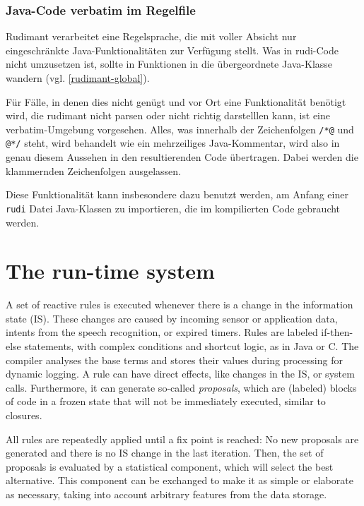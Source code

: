 \subsubsection{Java-Code verbatim im Regelfile} \label{rudi-verbatim}

Rudimant verarbeitet eine Regelsprache, die mit voller Absicht nur
eingeschränkte Java-Funktionalitäten zur Verfügung stellt. Was in rudi-Code
nicht umzusetzen ist, sollte in Funktionen in die übergeordnete Java-Klasse
wandern (vgl. \ref{rudimant-global}).

Für Fälle, in denen dies nicht genügt und vor Ort eine Funktionalität benötigt
wird, die rudimant nicht parsen oder nicht richtig darstelllen kann, ist eine
verbatim-Umgebung vorgesehen. Alles, was innerhalb der Zeichenfolgen \verb|/*@|
und \verb|@*/| steht, wird behandelt wie ein mehrzeiliges Java-Kommentar, wird
also in genau diesem Aussehen in den resultierenden Code übertragen. Dabei
werden die klammernden Zeichenfolgen ausgelassen.

Diese Funktionalität kann insbesondere dazu benutzt werden, am Anfang einer
\texttt{rudi} Datei Java-Klassen zu importieren, die im kompilierten Code
gebraucht werden.

\section{The run-time system}

A set of reactive rules is executed whenever there is a change in the
information state (IS). These changes are caused by incoming sensor or
application data, intents from the speech recognition, or expired timers.
Rules are labeled if-then-else statements, with complex conditions and shortcut
logic, as in Java or C. The compiler analyses the base terms and stores their
values during processing for dynamic logging. A rule can have direct effects,
like changes in the IS, or system calls. Furthermore, it can generate so-called
\emph{proposals}, which are (labeled) blocks of code in a frozen state that
will not be immediately executed, similar to closures.

All rules are repeatedly applied until a fix point is reached: No new proposals
are generated and there is no IS change in the last iteration. Then, the set of
proposals is evaluated by a statistical component, which will select the best
alternative. This component can be exchanged to make it as simple or elaborate
as necessary, taking into account arbitrary features from the data storage.




